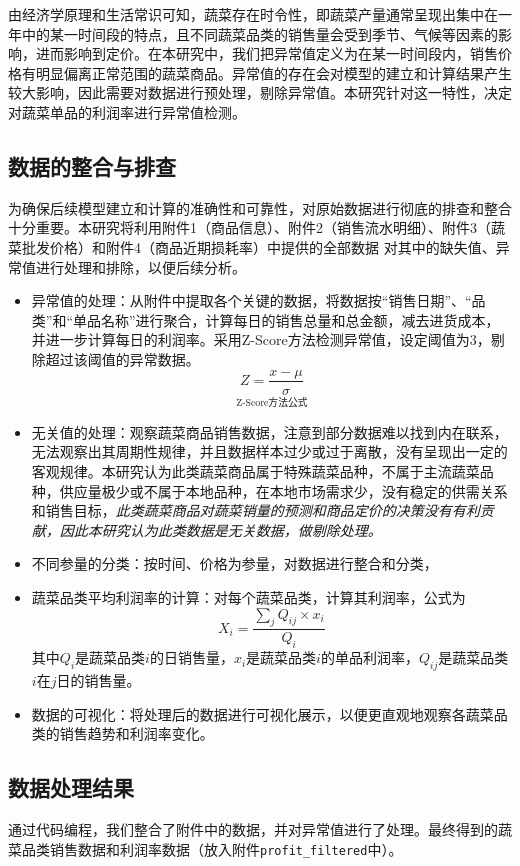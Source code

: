\documentclass{article}
\begin{document}
由经济学原理和生活常识可知，蔬菜存在时令性，即蔬菜产量通常呈现出集中在一年中的某一时间段的特点，且不同蔬菜品类的销售量会受到季节、气候等因素的影响，进而影响到定价。在本研究中，我们把异常值定义为在某一时间段内，销售价格有明显偏离正常范围的蔬菜商品。异常值的存在会对模型的建立和计算结果产生较大影响，因此需要对数据进行预处理，剔除异常值。本研究针对这一特性，决定对蔬菜单品的利润率进行异常值检测。
\subsection{数据的整合与排查}
为确保后续模型建立和计算的准确性和可靠性，对原始数据进行彻底的排查和整合十分重要。本研究将利用附件1（商品信息）、附件2（销售流水明细）、附件3（蔬菜批发价格）和附件4（商品近期损耗率）中提供的全部数据
对其中的缺失值、异常值进行处理和排除，以便后续分析。
\begin{itemize}
    \item 异常值的处理：从附件中提取各个关键的数据，将数据按“销售日期”、“品类”和“单品名称”进行聚合，计算每日的销售总量和总金额，减去进货成本，并进一步计算每日的利润率。采用Z-Score方法检测异常值，设定阈值为3，剔除超过该阈值的异常数据。
    \[
\underset{\text{Z-Score方法公式}}{Z = \frac{x - \mu}{\sigma}}
\]

    \item 无关值的处理：观察蔬菜商品销售数据，注意到部分数据难以找到内在联系，无法观察出其周期性规律，并且数据样本过少或过于离散，没有呈现出一定的客观规律。本研究认为此类蔬菜商品属于特殊蔬菜品种，不属于主流蔬菜品种，供应量极少或不属于本地品种，在本地市场需求少，没有稳定的供需关系和销售目标，\textit{此类蔬菜商品对蔬菜销量的预测和商品定价的决策没有有利贡献，因此本研究认为此类数据是无关数据，做剔除处理。}
    
    \item 不同参量的分类：按时间、价格为参量，对数据进行整合和分类，
    
    \item 蔬菜品类平均利润率的计算：对每个蔬菜品类，计算其利润率，公式为
    \[
X_i = \frac{\sum_j Q_{ij} \times x_i}{Q_i}
\]
其中$ Q_i$是蔬菜品类$i$的日销售量，$x_i$是蔬菜品类$i$的单品利润率，$Q_{ij}$是蔬菜品类$i$在$j$日的销售量。
    
    \item 数据的可视化：将处理后的数据进行可视化展示，以便更直观地观察各蔬菜品类的销售趋势和利润率变化。
\end{itemize}

\subsection{数据处理结果}
通过代码编程，我们整合了附件中的数据，并对异常值进行了处理。最终得到的蔬菜品类销售数据和利润率数据（放入附件\texttt{profit\_filtered}中）。
\end{document}
